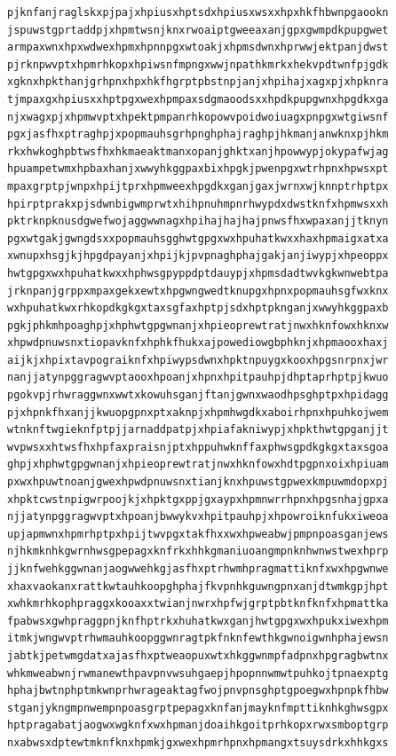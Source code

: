 \documentclass[11pt,letterpaper]{exam}
\begin{document}
\begin{questions}
\begin{verbatim}
pjknfanjraglskxpjpajxhpiusxhptsdxhpiusxwsxxhpxhkfhbwnpgaookn
jspuwstgprtaddpjxhpmtwsnjknxrwoaiptgweeaxanjgpxgwmpdkpupgwet
armpaxwnxhpxwdwexhpmxhpnnpgxwtoakjxhpmsdwnxhprwwjektpanjdwst
pjrknpwvptxhpmrhkopxhpiwsnfmpngxwwjnpathkmrkxhekvpdtwnfpjgdk
xgknxhpkthanjgrhpnxhpxhkfhgrptpbstnpjanjxhpihajxagxpjxhpknra
tjmpaxgxhpiusxxhptpgxwexhpmpaxsdgmaoodsxxhpdkpupgwnxhpgdkxga
njxwagxpjxhpmwvptxhpektpmpanrhkopowvpoidwoiuagxpnpgxwtgiwsnf
pgxjasfhxptraghpjxpopmauhsgrhpnghphajraghpjhkmanjanwknxpjhkm
rkxhwkoghpbtwsfhxhkmaeaktmanxopanjghktxanjhpowwypjokypafwjag
hpuampetwmxhpbaxhanjxwwyhkggpaxbixhpgkjpwenpgxwtrhpnxhpwsxpt
mpaxgrptpjwnpxhpijtprxhpmweexhpgdkxganjgaxjwrnxwjknnptrhptpx
hpirptprakxpjsdwnbigwmprwtxhihpnuhmpnrhwypdxdwstknfxhpmwsxxh
pktrknpknusdgwefwojaggwwnagxhpihajhajhajpnwsfhxwpaxanjjtknyn
pgxwtgakjgwngdsxxpopmauhsgghwtgpgxwxhpuhatkwxxhaxhpmaigxatxa
xwnupxhsgjkjhpgdpayanjxhpijkjpvpnaghphajgakjanjiwypjxhpeoppx
hwtgpgxwxhpuhatkwxxhphwsgpyppdptdauypjxhpmsdadtwvkgkwnwebtpa
jrknpanjgrppxmpaxgekxewtxhpgwngwedtknupgxhpnxpopmauhsgfwxknx
wxhpuhatkwxrhkopdkgkgxtaxsgfaxhptpjsdxhptpknganjxwwyhkggpaxb
pgkjphkmhpoaghpjxhphwtgpgwnanjxhpieoprewtratjnwxhknfowxhknxw
xhpwdpnuwsnxtiopavknfxhphkfhukxajpowediowgbphknjxhpmaooxhaxj
aijkjxhpixtavpograiknfxhpiwypsdwnxhpktnpuygxkooxhpgsnrpnxjwr
nanjjatynpggragwvptaooxhpoanjxhpnxhpitpauhpjdhptaprhptpjkwuo
pgokvpjrhwraggwnxwwtxkowuhsganjftanjgwnxwaodhpsghptpxhpidagg
pjxhpnkfhxanjjkwuopgpnxptxaknpjxhpmhwgdkxaboirhpnxhpuhkojwem
wtnknftwgieknfptpjjarnaddpatpjxhpiafakniwypjxhpkthwtgpganjjt
wvpwsxxhtwsfhxhpfaxpraisnjptxhppuhwknffaxphwsgpdkgkgxtaxsgoa
ghpjxhphwtgpgwnanjxhpieoprewtratjnwxhknfowxhdtpgpnxoixhpiuam
pxwxhpuwtnoanjgwexhpwdpnuwsnxtianjknxhpuwstgpwexkmpuwmdopxpj
xhpktcwstnpigwrpoojkjxhpktgxppjgxaypxhpmnwrrhpnxhpgsnhajgpxa
njjatynpggragwvptxhpoanjbwwykvxhpitpauhpjxhpowroiknfukxiweoa
upjapmwnxhpmrhptpxhpijtwvpgxtakfhxxwxhpweabwjpmpnpoasganjews
njhkmknhkgwrnhwsgpepagxknfrkxhhkgmaniuoangmpnknhwnwstwexhprp
jjknfwehkggwnanjaogwwehkgjasfhxptrhwmhpragmattiknfxwxhpgwnwe
xhaxvaokanxrattkwtauhkoopghphajfkvpnhkguwngpnxanjdtwmkgpjhpt
xwhkmrhkophpraggxkooaxxtwianjnwrxhpfwjgrptpbtknfknfxhpmattka
fpabwsxgwhpraggpnjknfhptrkxhuhatkwxganjhwtgpgxwxhpukxiwexhpm
itmkjwngwvptrhwmauhkoopggwnragtpkfnknfewthkgwnoigwnhphajewsn
jabtkjpetwmgdatxajasfhxptweaopuxwtxhkggwnmpfadpnxhpgragbwtnx
whkmweabwnjrwmanewthpavpnvwsuhgaepjhpopnnwmwtpuhkojtpnaexptg
hphajbwtnphptmkwnprhwrageaktagfwojpnvpnsghptgpoegwxhpnpkfhbw
stganjykngmpnwempnpoasgrptpepagxknfanjmayknfmpttiknhkghwsgpx
hptpragabatjaogwxwgknfxwxhpmanjdoaihkgoitprhkopxrwxsmboptgrp
nxabwsxdptewtmknfknxhpmkjgxwexhpmrhpnxhpmangxtsuysdrkxhhkgxs

\end{verbatim}
\end{questions}
\end{document}

